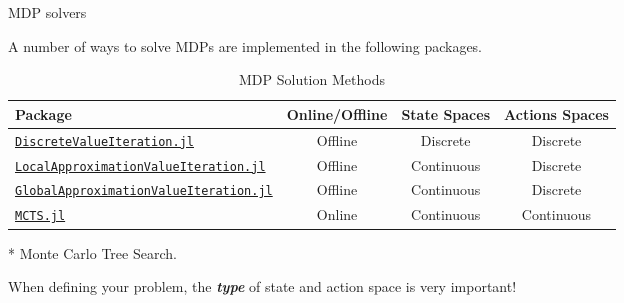 \begin{frame}{MDP solvers}

A number of ways to solve MDPs are implemented in the following packages.

\begin{table}[!t]
    {\scriptsize
    \centering
    \caption{\label{tab:solutions} MDP Solution Methods}
    \begin{threeparttable}
    \begin{tabular}{lccc}
        \toprule
        \textbf{Package} & \textbf{Online/Offline} & \textbf{State Spaces} & \textbf{Actions Spaces}\\
        \midrule
        \href{https://github.com/JuliaPOMDP/DiscreteValueIteration.jl}{\texttt{DiscreteValueIteration.jl}} & Offline & Discrete & Discrete \\
        \href{https://github.com/JuliaPOMDP/LocalApproximationValueIteration.jl}{\texttt{LocalApproximationValueIteration.jl}} & Offline & Continuous & Discrete \\
        \href{https://github.com/JuliaPOMDP/GlobalApproximationValueIteration.jl}{\texttt{GlobalApproximationValueIteration.jl}} & Offline & Continuous & Discrete \\
        \href{https://github.com/JuliaPOMDP/MCTS.jl}{\texttt{MCTS.jl}}\tnote{*} & Online & Continuous & Continuous \\
        \bottomrule
    \end{tabular}
    \begin{tablenotes}
        \scriptsize
        \item[*] {Monte Carlo Tree Search.}
    \end{tablenotes}
    \end{threeparttable}
    }
\end{table}

{\tiny
\begin{importantblock}
When defining your problem, the \textbf{\textit{type}} of state and action space is very important!
\end{importantblock}
}

\end{frame}



